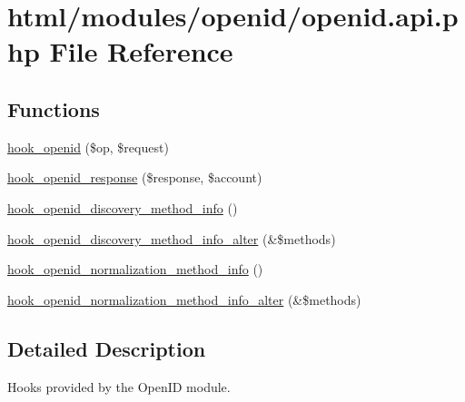 \hypertarget{openid_8api_8php}{
\section{html/modules/openid/openid.api.php File Reference}
\label{openid_8api_8php}
}
\subsection*{Functions}
\begin{DoxyCompactItemize}
\item 
\hyperlink{group__hooks_ga965f1ea7c6181118bd6d417c0f6db530}{hook\_\-openid} (\$op, \$request)
\item 
\hyperlink{group__hooks_gabc9e3b65c80d0d90001a8eebec8b5464}{hook\_\-openid\_\-response} (\$response, \$account)
\item 
\hyperlink{group__hooks_gaec6cbfdd913d8ba670c991b87bbf9676}{hook\_\-openid\_\-discovery\_\-method\_\-info} ()
\item 
\hyperlink{group__hooks_ga0b118d8fd00181113e6925c08c9dfb91}{hook\_\-openid\_\-discovery\_\-method\_\-info\_\-alter} (\&\$methods)
\item 
\hyperlink{group__hooks_ga53b4878d46aae5aea7de146ab543c585}{hook\_\-openid\_\-normalization\_\-method\_\-info} ()
\item 
\hyperlink{group__hooks_ga5600b490e79b0dd8bfff68558df53370}{hook\_\-openid\_\-normalization\_\-method\_\-info\_\-alter} (\&\$methods)
\end{DoxyCompactItemize}


\subsection{Detailed Description}
Hooks provided by the OpenID module. 